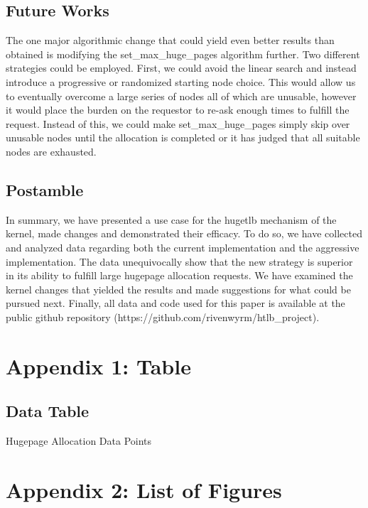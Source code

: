 \documentclass{article}
\begin{document}
\section{Future Works}
The one major algorithmic change that could yield even better results than obtained is modifying the set\_max\_huge\_pages algorithm further. Two different strategies could be employed. First, we could avoid the linear search and instead introduce a progressive or randomized starting node choice. This would allow us to eventually overcome a large series of nodes all of which are unusable, however it would place the burden on the requestor to re-ask enough times to fulfill the request. Instead of this, we could make set\_max\_huge\_pages simply skip over unusable nodes until the allocation is completed or it has judged that all suitable nodes are exhausted.

\section{Postamble}
In summary, we have presented a use case for the hugetlb mechanism of the kernel, made changes and demonstrated their efficacy. To do so, we have collected and analyzed data regarding both the current implementation and the aggressive implementation. The data unequivocally show that the new strategy is superior in its ability to fulfill large hugepage allocation requests. We have examined the kernel changes that yielded the results and made suggestions for what could be pursued next. Finally, all data and code used for this paper is available at the public github repository (https://github.com/rivenwyrm/htlb\_project).

\begin{appendices}
	\newpage
	\chapter{Appendix 1: Table}
		\section{Data Table}
		\begin{table}[h!]
			\caption{Hugepage Allocation Data Points}
			\label{table1}
			\end{table}
	\chapter{Appendix 2: List of Figures}
		\listoffigures
\end{appendices}
\end{document}
